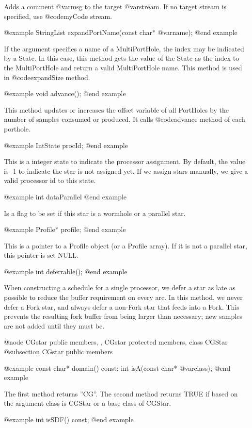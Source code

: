 Adds a comment @var{msg} to the target @var{stream}. If no target stream is
specified, use @code{myCode} stream.

@example
StringList expandPortName(const char* @var{name});
@end example

If the argument specifies a name of a MultiPortHole, the index may be
indicated by a State. In this case, this method gets the value of the
State as the index to the MultiPortHole and return a valid MultiPortHole name.
This method is used in @code{expandSize} method.

@example
void advance();
@end example

This method updates or increases the offset variable of all PortHoles by
the number of samples consumed or produced. It calls @code{advance} method
of each porthole.

@example
IntState procId;
@end example

This is a integer state to indicate the processor assignment. By default,
the value is -1 to indicate the star is not assigned yet. If we assign
stars manually, we give a valid processor id to this state.

@example
int dataParallel
@end example

Is a flag to be set if this star is a wormhole or a parallel star.

@example
Profile* profile;
@end example

This is a pointer to a Profile object (or a Profile array). If it is not
a parallel star, this pointer is set NULL.

@example
int deferrable();
@end example

When constructing a schedule for a single processor, we defer a star
as late as possible to reduce the buffer requirement on every arc.
In this method, we never defer a Fork star, and always defer a non-Fork
star that feeds into a Fork. This prevents the resulting fork buffer
from being larger than necessary; new samples are not added until they must be.

@node CGstar public members, , CGstar protected members, class CGStar
@subsection CGstar public members

@example
const char* domain() const;
int isA(const char* @var{class});
@end example

The first method returns ''CG''. The second method returns TRUE if
based on the argument class is CGStar or a base class of CGStar.

@example
int isSDF() const;
@end example


